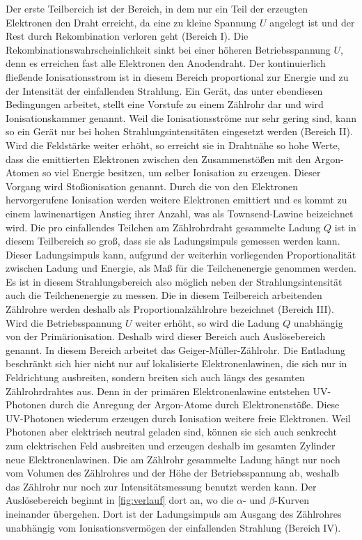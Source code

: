 Der erste Teilbereich ist der Bereich, in dem nur ein Teil der erzeugten Elektronen den Draht erreicht, da eine zu kleine Spannung $U$ angelegt ist 
und der Rest durch Rekombination verloren geht (Bereich \RN{1}). \newline
Die Rekombinationswahrscheinlichkeit sinkt bei einer höheren Betriebsspannung $U$, denn es erreichen fast alle Elektronen den Anodendraht. 
Der kontinuierlich fließende Ionisationsstrom ist in diesem Bereich proportional zur Energie und zu der Intensität der einfallenden Strahlung. Ein Gerät,
das unter ebendiesen Bedingungen arbeitet, stellt eine Vorstufe zu einem Zählrohr dar und wird Ionisationskammer genannt. Weil die Ionisationsströme nur sehr gering sind, kann so ein Gerät nur bei
hohen Strahlungsintensitäten eingesetzt werden (Bereich \RN{2}). \newline
Wird die Feldstärke weiter erhöht, so erreicht sie in Drahtnähe so hohe Werte, dass die emittierten Elektronen zwischen den Zusammenstößen mit den Argon-Atomen so viel Energie besitzen, um selber Ionisation zu erzeugen.
Dieser Vorgang wird Stoßionisation genannt. Durch die von den Elektronen hervorgerufene Ionisation werden weitere Elektronen emittiert und es kommt zu einem lawinenartigen Anstieg ihrer Anzahl, was als Townsend-Lawine beizeichnet wird. 
Die pro einfallendes Teilchen am Zählrohrdraht gesammelte Ladung $Q$ ist in diesem Teilbereich so groß, dass sie als Ladungsimpuls gemessen werden kann. Dieser Ladungsimpuls kann, aufgrund der weiterhin vorliegenden Proportionalität zwischen Ladung und Energie,
als Maß für die Teilchenenergie genommen werden. Es ist in diesem Strahlungsbereich also möglich neben der Strahlungsintensität auch die Teilchenenergie zu messen. Die in diesem Teilbereich arbeitenden Zählrohre werden deshalb als Proportionalzählrohre bezeichnet (Bereich \RN{3}). \newline
Wird die Betriebsspannung $U$ weiter erhöht, so wird die Ladung $Q$ unabhängig von der Primärionisation. Deshalb wird dieser Bereich auch Auslösebereich genannt. In diesem Bereich arbeitet das Geiger-Müller-Zählrohr.
Die Entladung beschränkt sich hier nicht nur auf lokalisierte Elektronenlawinen, die sich nur in Feldrichtung ausbreiten, sondern breiten sich auch längs des gesamten Zählrohrdrahtes aus.
Denn in der primären Elektronenlawine entstehen UV-Photonen durch die Anregung der Argon-Atome durch Elektronenstöße. Diese UV-Photonen wiederum erzeugen durch Ionisation weitere freie Elektronen. Weil Photonen aber elektrisch neutral geladen sind, können sie sich auch senkrecht zum elektrischen Feld ausbreiten
und erzeugen deshalb im gesamten Zylinder neue Elektronenlawinen. Die am Zählrohr  gesammelte Ladung hängt nur noch vom Volumen des Zählrohres und der Höhe der Betriebsspannung ab, weshalb das Zählrohr nur noch zur Intensitätsmessung benutzt werden kann.
Der Auslösebereich beginnt in \autoref{fig:verlauf} dort an, wo die $\alpha$- und $\beta$-Kurven ineinander übergehen. Dort ist der Ladungsimpuls am Ausgang des Zählrohres unabhängig vom Ionisationsvermögen der einfallenden Strahlung (Bereich \RN{4}).

